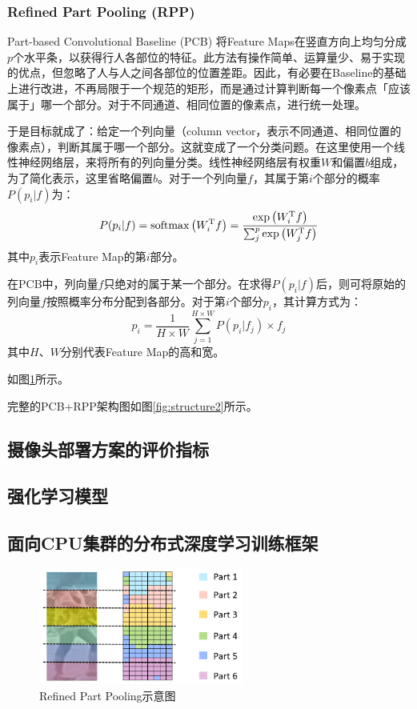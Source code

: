 \subsubsection{Refined Part Pooling (RPP)}
Part-based Convolutional Baseline (PCB) 将Feature Maps在竖直方向上均匀分成$p$个水平条，以获得行人各部位的特征。此方法有操作简单、运算量少、易于实现的优点，但忽略了人与人之间各部位的位置差距。因此，有必要在Baseline的基础上进行改进，不再局限于一个规范的矩形，而是通过计算判断每一个像素点「应该属于」哪一个部分。对于不同通道、相同位置的像素点，进行统一处理。

于是目标就成了：给定一个列向量（column vector，表示不同通道、相同位置的像素点），判断其属于哪一个部分。这就变成了一个分类问题。在这里使用一个线性神经网络层，来将所有的列向量分类。线性神经网络层有权重$W$和偏置$b$组成，为了简化表示，这里省略偏置$b$。对于一个列向量$f$，其属于第$i$个部分的概率$P(p_i|f)$为：
\begin{equation}
P(p_i|f)=\mathop{\rm softmax}\left(W_i^{\rm T}f\right)=\frac{\exp\left(W_i^{\rm T}f\right)}{\sum_j^p\exp\left(W_j^{\rm T}f\right)}
\end{equation}
其中$p_i$表示Feature Map的第$i$部分。

在PCB中，列向量$f$只绝对的属于某一个部分。在求得$P(p_i|f)$后，则可将原始的列向量$f$按照概率分布分配到各部分。对于第$i$个部分$p_i$，其计算方式为：
\begin{equation}
p_i=\frac{1}{H\times W}\sum_{j=1}^{H\times W}P(p_i|f_j)\times f_j
\end{equation}
其中$H$、$W$分别代表Feature Map的高和宽。

如图\ref{fig:refined}所示。

完整的PCB+RPP架构图如图\ref{fig:structure2}所示。

\subsection{摄像头部署方案的评价指标}

\subsection{强化学习模型}

\subsection{面向CPU集群的分布式深度学习训练框架}

\begin{figure}
\centering
\includegraphics[width=0.6\textwidth]{figure/outliers1}
\caption{Refined Part Pooling示意图}
\label{fig:refined}
\end{figure}

